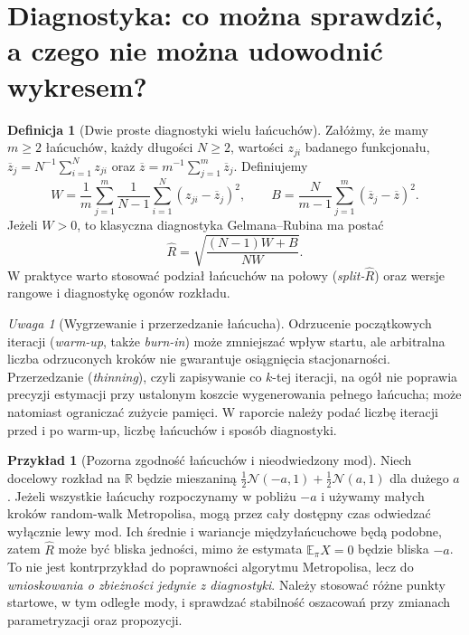 \documentclass[11pt,a4paper,oneside]{report}
\numberwithin{equation}{chapter}
\theoremstyle{plain}
\theoremstyle{definition}
\newtheorem{definicja}{Definicja}[chapter]
\newtheorem{przyklad}{Przykład}[chapter]
\theoremstyle{remark}
\newtheorem{uwaga}{Uwaga}[chapter]
\newcommand{\R}{\mathbb R}
\newcommand{\E}{\mathbb E}
\newcommand{\Normal}{\mathcal N}
\begin{document}
\section{Diagnostyka: co można sprawdzić, a czego nie można udowodnić wykresem?}
\begin{definicja}[Dwie proste diagnostyki wielu łańcuchów]
Załóżmy, że mamy $m\ge2$ łańcuchów, każdy długości
$N\ge2$, wartości $z_{ji}$ badanego funkcjonału,
$\overline z_j=N^{-1}\sum_{i=1}^Nz_{ji}$ oraz
$\overline z=m^{-1}\sum_{j=1}^m\overline z_j$.
Definiujemy
\[
 W=\frac1m\sum_{j=1}^m
 \frac1{N-1}\sum_{i=1}^N(z_{ji}-\overline z_j)^2,
 \qquad
 B=\frac N{m-1}\sum_{j=1}^m(\overline z_j-\overline z)^2.
\]
Jeżeli $W>0$, to klasyczna diagnostyka Gelmana--Rubina
ma postać
\[
 \widehat R=\sqrt{\frac{(N-1)W+B}{NW}}.
\]
W praktyce warto stosować podział łańcuchów na połowy
(\emph{split-$\widehat R$}) oraz wersje rangowe
i diagnostykę ogonów rozkładu.
\end{definicja}

\begin{uwaga}[Wygrzewanie i przerzedzanie łańcucha]
Odrzucenie początkowych iteracji (\emph{warm-up}, także \emph{burn-in})
może zmniejszać wpływ startu, ale arbitralna liczba odrzuconych kroków
nie gwarantuje osiągnięcia stacjonarności. Przerzedzanie (\emph{thinning}),
czyli zapisywanie co $k$-tej iteracji, na ogół nie poprawia
precyzji estymacji przy ustalonym koszcie wygenerowania pełnego łańcucha;
może natomiast ograniczać zużycie pamięci. W raporcie należy podać
liczbę iteracji przed i po warm-up, liczbę łańcuchów i sposób diagnostyki.
\end{uwaga}

\begin{przyklad}[Pozorna zgodność łańcuchów i nieodwiedzony mod]
Niech docelowy rozkład na $\R$ będzie mieszaniną
$\tfrac12\Normal(-a,1)+\tfrac12\Normal(a,1)$ dla dużego $a$.
Jeżeli wszystkie łańcuchy rozpoczynamy w pobliżu $-a$ i używamy
małych kroków random-walk Metropolisa, mogą przez cały dostępny
czas odwiedzać wyłącznie lewy mod. Ich średnie i wariancje
międzyłańcuchowe będą podobne, zatem $\widehat R$ może być
bliska jedności, mimo że estymata $\E_\pi X=0$ będzie bliska $-a$.
To nie jest kontrprzykład do poprawności algorytmu Metropolisa,
lecz do \emph{wnioskowania o zbieżności jedynie z diagnostyki}.
Należy stosować różne punkty startowe, w tym odległe mody,
i sprawdzać stabilność oszacowań przy zmianach parametryzacji
oraz propozycji.
\end{przyklad}
\end{document}
